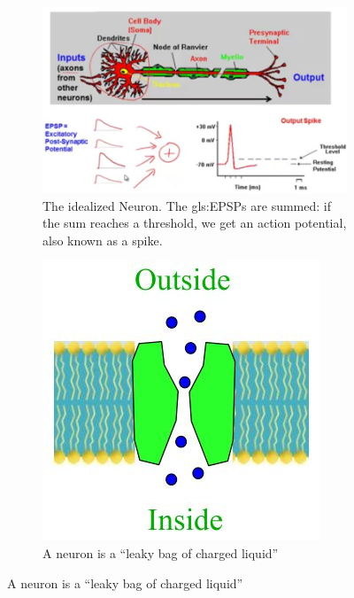 \documentclass[]{article}
\begin{document}
\begin{figure}[H]
	\caption{The Electrical Personality of Neurons}
	\begin{subfigure}[t]{0.45\textwidth}
		\caption{The idealized Neuron. The \gls{gls:EPSP}s are summed: if the sum reaches a threshold, we get an action potential, also known as a spike.}
		\includegraphics[width=\textwidth]{idealized-neuron}
	\end{subfigure}
	\begin{subfigure}[t]{0.45\textwidth}
		\begin{center}
			\caption{A neuron is a ``leaky bag of charged liquid''}\label{fig:what:is:a:neuron}
			\includegraphics[width=\textwidth]{what-is-a-neuron}

\end{center}
\end{subfigure}
\end{figure}
\end{document}
